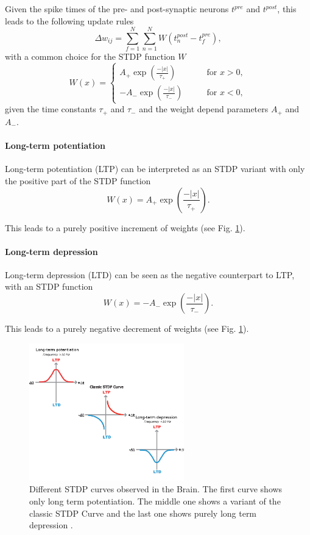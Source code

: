 Given the spike times of the pre- and post-synaptic neurons $t^{pre}$ and $t^{post}$, this leads to the following update rules \cite{gerstner2014neuronal, Sjostrom2010}
\[
\Delta w_{ij} = \sum_{f=1}^N \sum_{n=1}^N W(t^{post}_n - t^{pre}_f),
\]
with a common choice for the STDP function $W$
\[
W(x) =
\begin{cases}
A_+ \exp(\frac{-|x|}{\tau_+}) \quad \quad &\text{for  } x > 0,  \\
-A_- \exp(\frac{-|x|}{\tau_-}) \quad \quad &\text{for  } x < 0,
\end{cases}
\]
given the time constants $\tau_+$ and $\tau_-$ and the weight depend parameters $A_+$ and $A_-$.
     

\paragraph{Long-term potentiation} \label{c:ltp}
 
Long-term potentiation (LTP) can be interpreted as an STDP variant with only the positive part of the STDP function
\[
W(x) =  A_+ \exp(\frac{-|x|}{\tau_+}).
\]

This leads to a purely positive increment of weights (see Fig. \ref{fig:stdp}).

\paragraph{Long-term depression} \label{c:ldp}

Long-term depression (LTD) can be seen as the negative counterpart to LTP, with an STDP function
\[
W(x) =  -A_- \exp(\frac{-|x|}{\tau_-}).
\]

This leads to a purely negative decrement of weights (see Fig. \ref{fig:stdp}).

\begin{figure}
	\centering
    	\includegraphics[width=0.6\textwidth]{imgs/stdp_curves.jpg} 
    \caption[STDP curves observed in the Brain.]{Different STDP curves observed in the Brain. The first curve shows only long term potentiation. The middle one shows a variant of the classic STDP Curve and the last one shows purely long term depression \cite{Buchanan2010}.}
	\label{fig:stdp}
\end{figure}